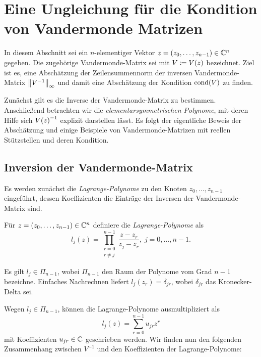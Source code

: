 \chapter{Eine Ungleichung für die Kondition von Vandermonde Matrizen}
In diesem Abschnitt sei ein $n$-elementiger Vektor $z = (z_0, \dots, z_{n-1})
\in \mathbb{C}^n$ gegeben.  Die zugehörige Vandermonde-Matrix sei mit $V \coloneqq
\text{$V(z)$}$ bezeichnet.  Ziel ist es, eine Abschätzung der Zeilensummennorm der
inversen Vandermonde-Matrix $\left\lVert V^{-1} \right\rVert_{\infty}$ und damit eine Abschätzung der
Kondition $\text{cond$ \left( V \right)$}$ zu finden.

Zunächst gilt es die Inverse der Vandermonde-Matrix zu bestimmen. Anschließend
betrachten wir die \emph{elementarsymmetrischen Polynome}, mit deren
Hilfe sich $\text{$V(z)$}^{-1}$ explizit darstellen lässt. Es folgt der eigentliche
Beweis der Abschätzung und einige Beispiele von Vandermonde-Matrizen mit
reellen Stützstellen und deren Kondition.

\section{Inversion der Vandermonde-Matrix}
Es werden zunächst die \emph{Lagrange-Polynome} zu den Knoten
$z_0, \dots, z_{n-1}$ eingeführt, dessen Koeffizienten die Einträge der
Inversen der Vandermonde-Matrix sind.

\begin{mydef}
    Für $ z = (z_0, \dots, z_{n-1}) \in \mathbb{C}^n $ definiere die
    \emph{Lagrange-Polynome} als
    \[
        l_j(z) = \prod_{\substack{r=0\\ r \neq j}}^{n-1} \frac{z - z_r}{z_j - z_r}, \; j = 0, \dots, n-1.
    \]
\end{mydef}

\begin{remark}
    Es gilt $l_j \in \Pi_{n-1}$, wobei $\Pi_{n-1}$ den Raum der Polynome vom
    Grad $n-1$ bezeichne.  Einfaches Nachrechnen liefert
    $l_j(z_r) = \delta_{jr}$, wobei $\delta_{jr}$ das Kronecker-Delta
    sei.
\end{remark}

Wegen $l_j \in \Pi_{n-1}$, können die Lagrange-Polynome ausmultipliziert als
\begin{equation}
    \label{eq:lagrange}
    l_j(z) = \sum_{r = 0}^{n-1} u_{jr} z^{r}
\end{equation}
mit Koeffizienten $u_{jr} \in \mathbb{C}$ geschrieben werden.
Wir finden nun den folgenden Zusammenhang zwischen $V^{-1}$ und den
Koeffizienten der Lagrange-Polynome:

